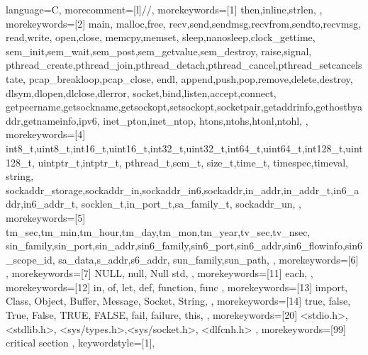 {%
	language=C,%
	morecomment=[l]{//},%
	morekeywords=[1]{%
		then,inline,strlen,%
	},%
	morekeywords=[2]{%
		main,
		malloc,free,%
		recv,send,sendmsg,recvfrom,sendto,recvmsg,
		read,write,
		open,close,
		memcpy,memset,
		sleep,nanosleep,clock_gettime,
		sem_init,sem_wait,sem_post,sem_getvalue,sem_destroy,
		raise,signal,
		pthread_create,pthread_join,pthread_detach,pthread_cancel,pthread_setcancelstate,
		pcap_breakloop,pcap_close,
		endl,
		append,push,pop,remove,delete,destroy,
		dlsym,dlopen,dlclose,dlerror,
		socket,bind,listen,accept,connect,
		getpeername,getsockname,getsockopt,setsockopt,socketpair,getaddrinfo,gethostbyaddr,getnameinfo,ipv6,
		inet_pton,inet_ntop,
		htons,ntohs,htonl,ntohl,
	},%
	morekeywords=[4]{%
		int8_t,uint8_t,int16_t,uint16_t,int32_t,uint32_t,int64_t,uint64_t,int128_t,uint128_t,
		uintptr_t,intptr_t,
		pthread_t,sem_t,
		size_t,time_t,
		timespec,timeval,
		string,
		sockaddr_storage,sockaddr_in,sockaddr_in6,sockaddr,in_addr,in_addr_t,in6_addr,in6_addr_t,
		socklen_t,in_port_t,sa_family_t,
		sockaddr_un,
	},%
	morekeywords=[5]{%
		tm_sec,tm_min,tm_hour,tm_day,tm_mon,tm_year,tv_sec,tv_nsec,
		sin_family,sin_port,sin_addr,sin6_family,sin6_port,sin6_addr,sin6_flowinfo,sin6_scope_id,
		sa_data,s_addr,s6_addr,
		sun_family,sun_path,
	},%
	morekeywords=[6]{%
	},%
	morekeywords=[7]{%
		NULL, null, Null
		std,
	},%
	morekeywords=[11]{%
		each,
	},%
	morekeywords=[12]{%
		in, of, let, def,
		function, func
	},%
	morekeywords=[13]{%
		import,
		Class, Object,
		Buffer, Message,
		Socket, String,
	},%
	morekeywords=[14]{%
		true, false, True, False, TRUE, FALSE,
		fail, failure,
		this,
	},%
	morekeywords=[20]{%
		<stdio.h>,<stdlib.h>,
		<sys/types.h>,<sys/socket.h>,
		<dlfcnh.h>
	},%
	morekeywords=[99]{%
		critical section
	},%
	keywordstyle=[1]\lstCFontBasic,%
}
